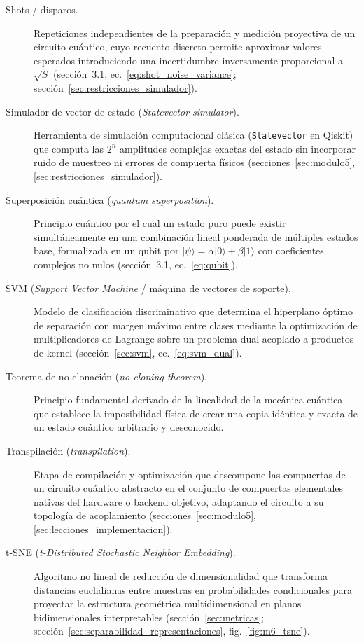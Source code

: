 \begin{description}
  \item[Shots / disparos.] Repeticiones independientes de la preparación y medición proyectiva de un circuito cuántico, cuyo recuento discreto permite aproximar valores esperados introduciendo una incertidumbre inversamente proporcional a $\sqrt{S}$ (sección~3.1, ec.~\ref{eq:shot_noise_variance}; sección~\ref{sec:restricciones_simulador}).

  \item[Simulador de vector de estado (\textit{Statevector simulator}).] Herramienta de simulación computacional clásica (\texttt{Statevector} en Qiskit) que computa las $2^n$ amplitudes complejas exactas del estado sin incorporar ruido de muestreo ni errores de compuerta físicos (secciones~\ref{sec:modulo5}, \ref{sec:restricciones_simulador}).

  \item[Superposición cuántica (\textit{quantum superposition}).] Principio cuántico por el cual un estado puro puede existir simultáneamente en una combinación lineal ponderada de múltiples estados base, formalizada en un qubit por $|\psi\rangle = \alpha|0\rangle + \beta|1\rangle$ con coeficientes complejos no nulos (sección~3.1, ec.~\ref{eq:qubit}).

  \item[SVM (\textit{Support Vector Machine} / máquina de vectores de soporte).] Modelo de clasificación discriminativo que determina el hiperplano óptimo de separación con margen máximo entre clases mediante la optimización de multiplicadores de Lagrange sobre un problema dual acoplado a productos de kernel (sección~\ref{sec:svm}, ec.~\ref{eq:svm_dual}).

  \item[Teorema de no clonación (\textit{no-cloning theorem}).] Principio fundamental derivado de la linealidad de la mecánica cuántica que establece la imposibilidad física de crear una copia idéntica y exacta de un estado cuántico arbitrario y desconocido.

  \item[Transpilación (\textit{transpilation}).] Etapa de compilación y optimización que descompone las compuertas de un circuito cuántico abstracto en el conjunto de compuertas elementales nativas del hardware o backend objetivo, adaptando el circuito a su topología de acoplamiento (secciones~\ref{sec:modulo5}, \ref{sec:lecciones_implementacion}).

  \item[t-SNE (\textit{t-Distributed Stochastic Neighbor Embedding}).] Algoritmo no lineal de reducción de dimensionalidad que transforma distancias euclidianas entre muestras en probabilidades condicionales para proyectar la estructura geométrica multidimensional en planos bidimensionales interpretables (sección~\ref{sec:metricas}; sección~\ref{sec:separabilidad_representaciones}, fig.~\ref{fig:m6_tsne}).


\end{description}
